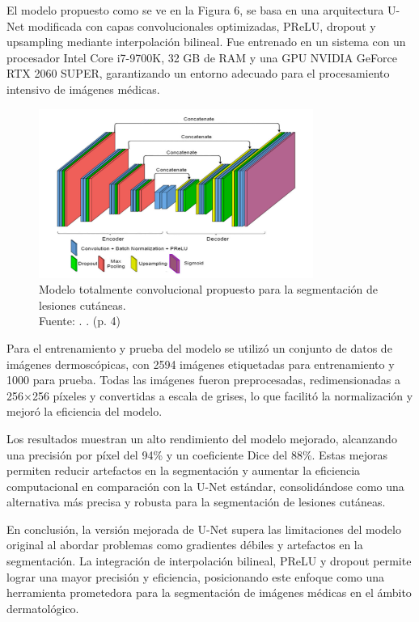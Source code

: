 El modelo propuesto como se ve en la Figura 6, se basa en una arquitectura U-Net modificada con capas convolucionales optimizadas, PReLU, dropout y upsampling mediante interpolación bilineal. Fue entrenado en un sistema con un procesador Intel Core i7-9700K, 32 GB de RAM y una GPU NVIDIA GeForce RTX 2060 SUPER, garantizando un entorno adecuado para el procesamiento intensivo de imágenes médicas.

\begin{figure}[!ht]
	\begin{center}
		\includegraphics[width=0.80\textwidth]{2/figures/segmentation1.png}
		\caption[Modelo totalmente convolucional propuesto para la segmentación de lesiones cutáneas]{Modelo totalmente convolucional propuesto para la segmentación de lesiones cutáneas.\\
			Fuente: \cite{karshiev2020improved}. . (p. 4)}
		\label{2:fig6}
	\end{center}
\end{figure}

Para el entrenamiento y prueba del modelo se utilizó un conjunto de datos de imágenes dermoscópicas, con 2594 imágenes etiquetadas para entrenamiento y 1000 para prueba. Todas las imágenes fueron preprocesadas, redimensionadas a 256×256 píxeles y convertidas a escala de grises, lo que facilitó la normalización y mejoró la eficiencia del modelo.

Los resultados muestran un alto rendimiento del modelo mejorado, alcanzando una precisión por píxel del 94\% y un coeficiente Dice del 88\%. Estas mejoras permiten reducir artefactos en la segmentación y aumentar la eficiencia computacional en comparación con la U-Net estándar, consolidándose como una alternativa más precisa y robusta para la segmentación de lesiones cutáneas.

En conclusión, la versión mejorada de U-Net supera las limitaciones del modelo original al abordar problemas como gradientes débiles y artefactos en la segmentación. La integración de interpolación bilineal, PReLU y dropout permite lograr una mayor precisión y eficiencia, posicionando este enfoque como una herramienta prometedora para la segmentación de imágenes médicas en el ámbito dermatológico.





